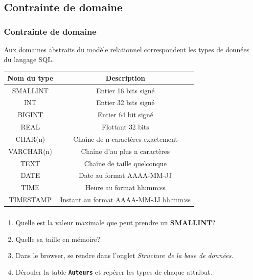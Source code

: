 \documentclass[svgnames,11pt]{beamer}
\begin{document}
\subsection{Contrainte de domaine}
\begin{frame}
    \frametitle{Contrainte de domaine}

    Aux domaines abstraits du modèle relationnel correspondent les types de données du langage SQL.
\begin{center}
\begin{tabular}{|c|c|}
\hline 
\textbf{Nom du type} & \textbf{Description} \\ 
\hline 
SMALLINT & Entier 16 bits signé \\ 
\hline 
INT & Entier 32 bits signé \\ 
\hline 
BIGINT & Entier 64 bit signé \\ 
\hline 
REAL & Flottant 32 bits \\ 
\hline 
CHAR(n) & Chaîne de n caractères exactement \\ 
\hline 
VARCHAR(n) & Chaîne d'au plus n caractères \\ 
\hline 
TEXT & Chaîne de taille quelconque \\ 
\hline 
DATE & Date au format AAAA-MM-JJ \\ 
\hline 
TIME & Heure au format hh:mm:ss \\ 
\hline 
TIMESTAMP & Instant au format AAAA-MM-JJ hh:mm:ss \\ 
\hline 
\end{tabular}
\end{center}
\end{frame}
\begin{frame}
    \frametitle{}
\begin{activite}
    \begin{enumerate}
        \item Quelle est la valeur maximale que peut prendre un \textbf{SMALLINT}?
        \item Quelle sa taille en mémoire?
        \item Dans le browser, se rendre dans l'onglet \emph{Structure de la base de données}.
        \item Dérouler la table \texttt{\textbf{Auteurs}} et repérer les types de chaque attribut.
        \end{enumerate}
        \end{activite}

\end{frame}
\end{document}
